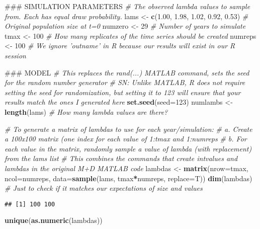 \documentclass[]{article}
\newenvironment{Shaded}{\begin{snugshade}}{\end{snugshade}}
\newcommand{\KeywordTok}[1]{\textcolor[rgb]{0.13,0.29,0.53}{\textbf{#1}}}
\newcommand{\DataTypeTok}[1]{\textcolor[rgb]{0.13,0.29,0.53}{#1}}
\newcommand{\DecValTok}[1]{\textcolor[rgb]{0.00,0.00,0.81}{#1}}
\newcommand{\FloatTok}[1]{\textcolor[rgb]{0.00,0.00,0.81}{#1}}
\newcommand{\StringTok}[1]{\textcolor[rgb]{0.31,0.60,0.02}{#1}}
\newcommand{\CommentTok}[1]{\textcolor[rgb]{0.56,0.35,0.01}{\textit{#1}}}
\newcommand{\OperatorTok}[1]{\textcolor[rgb]{0.81,0.36,0.00}{\textbf{#1}}}
\newcommand{\NormalTok}[1]{#1}
\begin{document}
\begin{Shaded}
\begin{Highlighting}[]
\NormalTok{### SIMULATION PARAMETERS}
\CommentTok{# The observed lambda values to sample from. Each has equal draw probability.}
\NormalTok{lams <-}\StringTok{ }\KeywordTok{c}\NormalTok{(}\FloatTok{1.00}\NormalTok{, }\FloatTok{1.98}\NormalTok{, }\FloatTok{1.02}\NormalTok{, }\FloatTok{0.92}\NormalTok{, }\FloatTok{0.53}\NormalTok{) }
\CommentTok{# Original population size at t=0}
\NormalTok{numzero <-}\StringTok{ }\DecValTok{29}
\CommentTok{# Number of years to simulate }
\NormalTok{tmax <-}\StringTok{ }\DecValTok{100}
\CommentTok{# How many replicates of the time series should be created}
\NormalTok{numreps <-}\StringTok{ }\DecValTok{100}
\CommentTok{# We ignore 'outname' in R because our results will exist in our R session}

\NormalTok{### MODEL}
\CommentTok{# This replaces the rand(...) MATLAB command, sets the seed for the random number generator}
\CommentTok{# SN: Unlike MATLAB, R does not require setting the seed for randomization, but setting it to 123 will ensure that your results match the ones I generated here}
\KeywordTok{set.seed}\NormalTok{(}\DataTypeTok{seed=}\DecValTok{123}\NormalTok{) }
\NormalTok{numlambs <-}\StringTok{ }\KeywordTok{length}\NormalTok{(lams) }\CommentTok{# How many lambda values are there?}

\CommentTok{# To generate a matrix of lambdas to use for each year/simulation:}
\CommentTok{#    a. Create a 100x100 matrix (one index for each value of 1:tmax and 1:numreps}
\CommentTok{#    b. For each value in the matrix, randomly sample a value of lambda (with replacement) from the lams list}
\CommentTok{# This combines the commands that create intvalues and lambdas in the original M+D MATLAB code}
\NormalTok{lambdas <-}\StringTok{ }\KeywordTok{matrix}\NormalTok{(}\DataTypeTok{nrow=}\NormalTok{tmax, }\DataTypeTok{ncol=}\NormalTok{numreps, }\DataTypeTok{data=}\KeywordTok{sample}\NormalTok{(lams, tmax}\OperatorTok{*}\NormalTok{numreps, }\DataTypeTok{replace=}\NormalTok{T))}
\KeywordTok{dim}\NormalTok{(lambdas) }\CommentTok{# Just to check if it matches our expectations of size and values}
\end{Highlighting}
\end{Shaded}

\begin{verbatim}
## [1] 100 100
\end{verbatim}

\begin{Shaded}
\begin{Highlighting}[]
\KeywordTok{unique}\NormalTok{(}\KeywordTok{as.numeric}\NormalTok{(lambdas))}
\end{Highlighting}
\end{Shaded}
\end{document}
